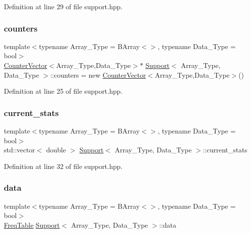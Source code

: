 Definition at line 29 of file support.\+hpp.

\mbox{\label{class_support_a17bd2a9dca9bf7a167a47f4c8676183a}} 
\subsubsection{\texorpdfstring{counters}{counters}}
{\footnotesize\ttfamily template$<$typename Array\+\_\+\+Type = B\+Array$<$$>$, typename Data\+\_\+\+Type = bool$>$ \\
\hyperlink{class_counter_vector}{Counter\+Vector}$<$Array\+\_\+\+Type,Data\+\_\+\+Type$>$$\ast$ \hyperlink{class_support}{Support}$<$ Array\+\_\+\+Type, Data\+\_\+\+Type $>$\+::counters = new \hyperlink{class_counter_vector}{Counter\+Vector}$<$Array\+\_\+\+Type,Data\+\_\+\+Type$>$()}



Definition at line 25 of file support.\+hpp.

\mbox{\label{class_support_ada67557033378742f8592a96f39d1127}} 
\subsubsection{\texorpdfstring{current\+\_\+stats}{current\_stats}}
{\footnotesize\ttfamily template$<$typename Array\+\_\+\+Type = B\+Array$<$$>$, typename Data\+\_\+\+Type = bool$>$ \\
std\+::vector$<$ double $>$ \hyperlink{class_support}{Support}$<$ Array\+\_\+\+Type, Data\+\_\+\+Type $>$\+::current\+\_\+stats}



Definition at line 32 of file support.\+hpp.

\mbox{\label{class_support_ad399b4c1f9619c4e90dea0ffcf3c85c1}} 
\subsubsection{\texorpdfstring{data}{data}}
{\footnotesize\ttfamily template$<$typename Array\+\_\+\+Type = B\+Array$<$$>$, typename Data\+\_\+\+Type = bool$>$ \\
\hyperlink{class_freq_table}{Freq\+Table} \hyperlink{class_support}{Support}$<$ Array\+\_\+\+Type, Data\+\_\+\+Type $>$\+::data}



